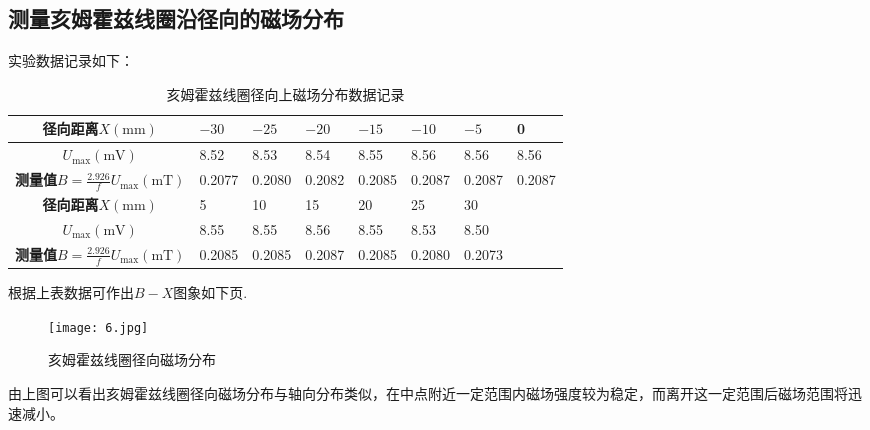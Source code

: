 \documentclass[UTF-8,twoside,cs4size]{ctexart}
\begin{document}
	\subsection{测量亥姆霍兹线圈沿径向的磁场分布}
	实验数据记录如下：
	\begin{table}[!h]
		\centering
		\renewcommand\arraystretch{1.5}
		\caption{亥姆霍兹线圈径向上磁场分布数据记录}
		\small
		\begin{tabularx}{\textwidth}{|c|Y|Y|Y|Y|Y|Y|Y|}
			\hline
			\textbf{径向距离}$ X(\mathrm{mm}) $&$ -30 $&$ -25 $&$ -20 $&$ -15 $&$ -10 $&$ -5 $&0\\
			\hline
			$ U_\max(\mathrm{mV}) $&8.52&8.53&8.54&8.55&8.56&8.56&8.56\\
			\hline
			\textbf{测量值}$ B=\frac{2.926}{f}U_\max(\mathrm{mT}) $&0.2077&0.2080&0.2082&0.2085&0.2087&0.2087&0.2087\\
			\hline
			\textbf{径向距离}$ X(\mathrm{mm}) $&5&10&15&20&25&30&\\
			\hline
			$ U_\max(\mathrm{mV}) $&8.55&8.55&8.56&8.55&8.53&8.50&\\
			\hline
			\textbf{测量值}$ B=\frac{2.926}{f}U_\max(\mathrm{mT}) $&0.2085&0.2085&0.2087&0.2085&0.2080&0.2073&\\
			\hline
		\end{tabularx}
	\end{table}
	
	根据上表数据可作出$ B-X $图象如下页.
	
	\newpage
	
	\begin{figure}[!h]
		\centering
		\texttt{[image: 6.jpg]}
		\caption{亥姆霍兹线圈径向磁场分布}
	\end{figure}

	由上图可以看出亥姆霍兹线圈径向磁场分布与轴向分布类似，在中点附近一定范围内磁场强度较为稳定，而离开这一定范围后磁场范围将迅速减小。
	
\end{document}
